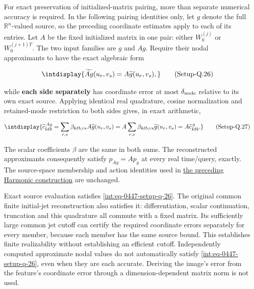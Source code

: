 
For exact preservation of initialized-matrix pairing, more than separate numerical accuracy is required. In the following pairing identities only, let \(g\) denote the full \(\mathbb R^n\)-valued source, so the preceding coordinate estimates apply to each of its entries. Let \(A\) be the fixed initialized matrix in one pair: either \(W_0^{(j)}\) or \(W_0^{(j+1)T}\). The two input families are \(g\) and \(Ag\). Require their nodal approximants to have the exact algebraic form


\label{int:eq-setup-q-26}
\begingroup\renewcommand{\theHequation}{intdisplay.899}
\begin{equation}
\intdisplay{
\widetilde{Ag}(u_r,v_s)=A\widetilde g(u_r,v_s),
}
\tag{Setup-Q.26}
\label{int:eq-0447-setup-q-26}
\end{equation}
\endgroup


while \textbf{each side separately} has coordinate error at most \(\delta_{\rm node}\) relative to its own exact source. Applying identical real quadrature, cosine normalization and retained-mode restriction to both sides gives, in exact arithmetic,


\label{int:eq-setup-q-27}
\begingroup\renewcommand{\theHequation}{intdisplay.900}
\begin{equation}
\intdisplay{
\widetilde c^{\,Ag}_{k\ell b}
=\sum_{r,s}\beta_{k\ell b,rs}A\widetilde g(u_r,v_s)
=A\sum_{r,s}\beta_{k\ell b,rs}\widetilde g(u_r,v_s)
=A\widetilde c^{\,g}_{k\ell b}.
}
\tag{Setup-Q.27}
\label{int:eq-0448-setup-q-27}
\end{equation}
\endgroup


The scalar coefficients \(\beta\) are the same in both sums. The reconstructed approximants consequently satisfy \(p_{Ag}=Ap_g\) at every real time/query, exactly. The source-space membership and action identities used in \hyperref[int:harmonic-construction]{the preceding Harmonic construction} are unchanged.



Exact source evaluation satisfies \hyperref[int:eq-setup-q-26]{\eqref{int:eq-0447-setup-q-26}}. The original common finite initial-jet reconstruction also satisfies it: differentiation, scalar continuation, truncation and this quadrature all commute with a fixed matrix. Its sufficiently large common jet cutoff can certify the required coordinate errors separately for every member, because each member has the same source bound. This establishes finite realizability without establishing an efficient cutoff. Independently computed approximate nodal values do not automatically satisfy \hyperref[int:eq-setup-q-26]{\eqref{int:eq-0447-setup-q-26}}, even when they are each accurate. Deriving the image's error from the feature's coordinate error through a dimension-dependent matrix norm is not used.


